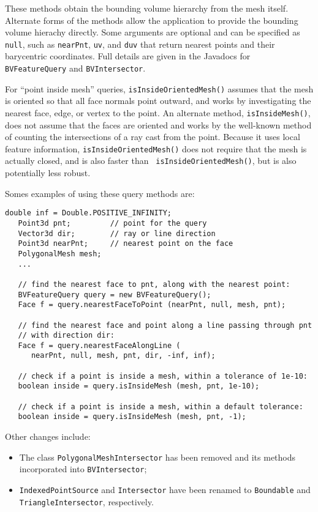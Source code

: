 \documentclass{article}
\begin{document}
These methods obtain the bounding volume hierarchy from the mesh
itself. Alternate forms of the methods allow the application to
provide the bounding volume hierachy directly. Some arguments are
optional and can be specified as {\tt null}, such as {\tt nearPnt},
{\tt uv}, and {\tt duv} that return nearest points and their
barycentric coordinates. Full details are given in the Javadocs for
{\tt BVFeatureQuery} and {\tt BVIntersector}.

For ``point inside mesh'' queries, {\tt isInsideOrientedMesh()} assumes
that the mesh is oriented so that all face normals point outward, and
works by investigating the nearest face, edge, or vertex to the point.
An alternate method, {\tt isInsideMesh()}, does not assume that the
faces are oriented and works by the well-known method of counting the
intersections of a ray cast from the point. Because it uses local
feature information, {\tt isInsideOrientedMesh()} does not require
that the mesh is actually closed, and is also faster than {\tt
isInsideOrientedMesh()}, but is also potentially less robust.

Somes examples of using these query methods are:

\begin{lstlisting}[]
   double inf = Double.POSITIVE_INFINITY;
   Point3d pnt;         // point for the query
   Vector3d dir;        // ray or line direction
   Point3d nearPnt;     // nearest point on the face
   PolygonalMesh mesh;
   ...

   // find the nearest face to pnt, along with the nearest point:
   BVFeatureQuery query = new BVFeatureQuery(); 
   Face f = query.nearestFaceToPoint (nearPnt, null, mesh, pnt);

   // find the nearest face and point along a line passing through pnt
   // with direction dir:
   Face f = query.nearestFaceAlongLine (
      nearPnt, null, mesh, pnt, dir, -inf, inf);

   // check if a point is inside a mesh, within a tolerance of 1e-10:
   boolean inside = query.isInsideMesh (mesh, pnt, 1e-10);

   // check if a point is inside a mesh, within a default tolerance:
   boolean inside = query.isInsideMesh (mesh, pnt, -1);
\end{lstlisting}

Other changes include:

\begin{itemize}

\item The class {\tt PolygonalMeshIntersector} has been removed and
its methods incorporated into {\tt BVIntersector};

\item {\tt IndexedPointSource} and {\tt Intersector} have been renamed
to {\tt Boundable} and {\tt TriangleIntersector}, respectively.

\end{itemize}
\end{document}
